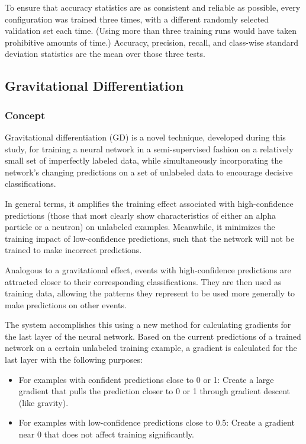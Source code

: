 \documentclass[10pt]{article}
\begin{document}
To ensure that accuracy statistics are as consistent and reliable as possible, every configuration was trained three times, with a different randomly selected validation set each time. (Using more than three training runs would have taken prohibitive amounts of time.) Accuracy, precision, recall, and class-wise standard deviation statistics are the mean over those three tests.

\subsection{Gravitational Differentiation}

\subsubsection{Concept}

Gravitational differentiation (GD) is a novel technique, developed during this study, for training a neural network in a semi-supervised fashion on a relatively small set of imperfectly labeled data, while simultaneously incorporating the network's changing predictions on a set of unlabeled data to encourage decisive classifications.

In general terms, it amplifies the training effect associated with high-confidence predictions (those that most clearly show characteristics of either an alpha particle or a neutron) on unlabeled examples. Meanwhile, it minimizes the training impact of low-confidence predictions, such that the network will not be trained to make incorrect predictions.

Analogous to a gravitational effect, events with high-confidence predictions are attracted closer to their corresponding classifications. They are then used as training data, allowing the patterns they represent to be used more generally to make predictions on other events.

The system accomplishes this using a new method for calculating gradients for the last layer of the neural network. Based on the current predictions of a trained network on a certain unlabeled training example, a gradient is calculated for the last layer with the following purposes:

\begin{itemize}
    \item For examples with confident predictions close to 0 or 1: Create a large gradient that pulls the prediction closer to 0 or 1 through gradient descent (like gravity).
    \item For examples with low-confidence predictions close to 0.5: Create a gradient near 0 that does not affect training significantly.
\end{itemize}
\end{document}

